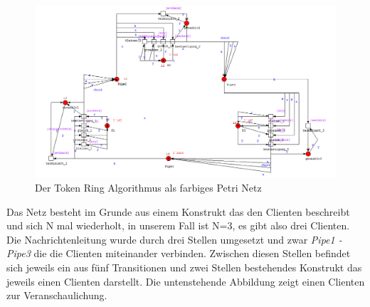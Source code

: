 \begin{figure}[H]
\centering
\includegraphics[width=1\linewidth]{kapitel/hauptteil/img/cpn}
\caption{Der Token Ring Algorithmus als farbiges Petri Netz}
\label{fig:cpn}
\end{figure}

Das Netz besteht im Grunde aus einem Konstrukt das den Clienten beschreibt und sich N mal wiederholt, in unserem Fall ist N=3, es gibt also drei Clienten. Die Nachrichtenleitung wurde durch drei Stellen umgesetzt und zwar \textit{Pipe1 - Pipe3} die die Clienten miteinander verbinden. Zwischen diesen Stellen befindet sich jeweils ein aus fünf Transitionen und zwei Stellen bestehendes Konstrukt das jeweils einen Clienten darstellt. Die untenstehende Abbildung zeigt einen Clienten zur Veranschaulichung. 

